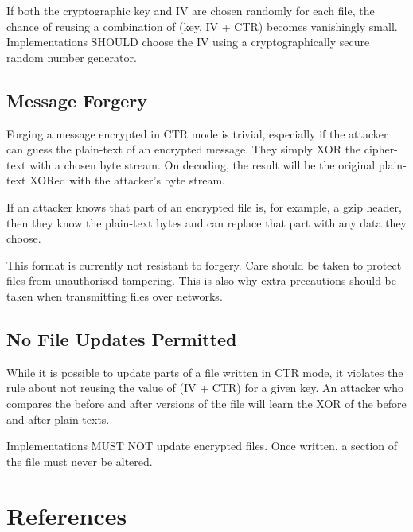\documentclass[10pt]{article}
\begin{document}
If both the cryptographic key and IV are chosen randomly for each file, the chance of reusing a combination of
(key, IV + CTR) becomes vanishingly small.
Implementations SHOULD choose the IV using a cryptographically secure random number generator.

\subsection{Message Forgery}
Forging a message encrypted in CTR mode is trivial, especially if the attacker can guess the plain-text of an encrypted
message.
They simply XOR the cipher-text with a chosen byte stream.
On decoding, the result will be the original plain-text XORed with the attacker's byte stream.

If an attacker knows that part of an encrypted file is, for example, a gzip header, then they know the plain-text bytes
and can replace that part with any data they choose.

This format is currently not resistant to forgery.
Care should be taken to protect files from unauthorised tampering.
This is also why extra precautions should be taken when transmitting files over networks.

\subsection{No File Updates Permitted}
While it is possible to update parts of a file written in CTR mode, it violates the rule about not reusing the value
of (IV + CTR) for a given key.
An attacker who compares the before and after versions of the file will learn the XOR of the before and after
plain-texts.

Implementations MUST NOT update encrypted files.
Once written, a section of the file must never be altered.

\section{References}
\end{document}
